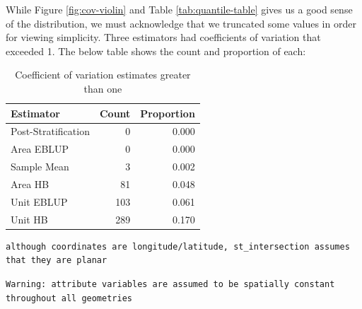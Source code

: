 \documentclass[12pt,twoside]{reedthesis}
\newenvironment{Shaded}{\begin{snugshade}}{\end{snugshade}}
\newcommand{\DataTypeTok}[1]{\textcolor[rgb]{0.13,0.29,0.53}{#1}}
\newcommand{\KeywordTok}[1]{\textcolor[rgb]{0.13,0.29,0.53}{\textbf{#1}}}
\newcommand{\NormalTok}[1]{#1}
\newcommand{\OperatorTok}[1]{\textcolor[rgb]{0.81,0.36,0.00}{\textbf{#1}}}
\newcommand{\OtherTok}[1]{\textcolor[rgb]{0.56,0.35,0.01}{#1}}
\newcommand{\StringTok}[1]{\textcolor[rgb]{0.31,0.60,0.02}{#1}}
\begin{document}
While Figure \ref{fig:cov-violin} and Table \ref{tab:quantile-table} gives us a good sense of the distribution, we must acknowledge that we truncated some values in order for viewing simplicity. Three estimators had coefficients of variation that exceeded 1. The below table shows the count and proportion of each:
\begin{longtable}[t]{lrr}
\caption{\label{tab:over-one}Coefficient of variation estimates greater than one}\\
\toprule
Estimator & Count & Proportion\\
\midrule
Post-Stratification & 0 & 0.000\\
Area EBLUP & 0 & 0.000\\
Sample Mean & 3 & 0.002\\
Area HB & 81 & 0.048\\
Unit EBLUP & 103 & 0.061\\
\addlinespace
Unit HB & 289 & 0.170\\
\bottomrule
\end{longtable}
\begin{Shaded}
\end{Shaded}
\begin{verbatim}
although coordinates are longitude/latitude, st_intersection assumes that they are planar
\end{verbatim}
\begin{verbatim}
Warning: attribute variables are assumed to be spatially constant
throughout all geometries
\end{verbatim}
\end{document}
